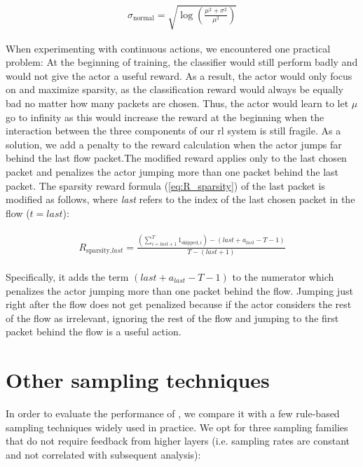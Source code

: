 \documentclass[conference]{IEEEtran}
\begin{document}
\begin{align}
\sigma_{\text{normal}} = \sqrt{\log\left(\frac{\mu^2 + \sigma^2}{\mu^2}\right)}
\end{align}

When experimenting with continuous actions, we encountered one practical problem: At the beginning of training, the classifier would still perform badly and would not give the actor a useful reward. As a result, the actor would only focus on and maximize sparsity, as the classification reward would always be equally bad no matter how many packets are chosen. Thus, the actor would learn to let $\mu$ go to infinity as this would increase the reward at the beginning when the interaction between the three components of our \gls{rl} system is still fragile. As a solution, we add a penalty to the reward calculation when the actor jumps far behind the last flow packet.The modified reward applies only to the last chosen packet and penalizes the actor jumping more than one packet behind the last packet. The sparsity reward formula (\autoref{eq:R_sparsity}) of the last packet is modified as follows, where \textit{last} refers to the index of the last chosen packet in the flow ($t=last$):

\begin{align}
\begin{split}
R_{\text{sparsity},\textit{last}} = \frac{\left(\sum_{i=\textit{last}+1}^{T} 1_{\text{skipped},i}\right) - \left(\textit{last}+a_{\textit{last}} - T - 1\right)}{T- (\textit{last}+1)}
\end{split}
\label{eq:R_sparsity_last}
\end{align}

Specifically, it adds the term $\left(\textit{last}+a_{\textit{last}} - T - 1\right)$ to the numerator which penalizes the actor jumping more than one packet behind the flow. Jumping just right after the flow does not get penalized because if the actor considers the rest of the flow as irrelevant, ignoring the rest of the flow and jumping to the first packet behind the flow is a useful action.

\section{Other sampling techniques}
\label{sec:other_sampling_techniques}
In order to evaluate the performance of \ours, we compare it with a few rule-based sampling techniques widely used in practice.
We opt for three sampling families that do not require feedback from higher layers (i.e. sampling rates are constant and not correlated with subsequent analysis): %
\end{document}
